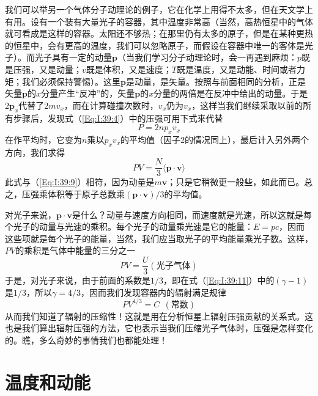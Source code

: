 我们可以举另一个气体分子动理论的例子，它在化学上用得不太多，但在天文学上有用。设有一个装有大量光子的容器，其中温度非常高（当然，高热恒星中的气体就可看成是这样的容器。太阳还不够热；在那里仍有太多的原子，但是在某种更热的恒星中，会有更高的温度，我们可以忽略原子，而假设在容器中唯一的客体是光子）。而光子具有一定的动量$\boldsymbol{p}$（当我们学习分子动理论时，会一再遇到麻烦：$p$既是压强，又是动量；$v$既是体积，又是速度；$T$既是温度，又是动能、时间或者力矩；我们必须保持警惕）。这里$\boldsymbol{p}$是动量，是矢量。按照与前面相同的分析，正是矢量$\boldsymbol{p}$的$x$分量产生“反冲”的，矢量$\boldsymbol{p}$的$x$分量的两倍是在反冲中给出的动量。于是$2\boldsymbol{p}_x$代替了$2mv_x$，而在计算碰撞次数时，$v_x$仍为$v_x$，这样当我们继续采取以前的所有步骤后，发现式（\ref{Eq:I:39:4}）中的压强可用下式来代替
\begin{equation}
    \label{Eq:I:39:15}
    P = 2np_xv_x
\end{equation}
在作平均时，它变为$n$乘以$p_xv_x$的平均值（因子$2$的情况同上），最后计入另外两个方向，我们求得
\begin{equation}
    \label{Eq:I:39:16}
    PV = \frac{N}{3}\langle \boldsymbol{p} \cdot \boldsymbol{v} \rangle
\end{equation}
此式与（\ref{Eq:I:39:9}）相符，因为动量是$m\boldsymbol{v}$；只是它稍微更一般些，如此而已。总之，压强乘体积等于原子总数乘$(\boldsymbol{p}\cdot\boldsymbol{v})/3$的平均值。

对光子来说，$\boldsymbol{p}\cdot\boldsymbol{v}$是什么？动量与速度方向相同，而速度就是光速，所以这就是每个光子的动量与光速的乘积。每个光子的动量乘光速是它的能量：$E=pc$，因而这些项就是每个光子的能量，当然，我们应当取光子的平均能量乘光子数。这样，$PV$的乘积是气体中能量的三分之一
\begin{equation}
    \label{Eq:I:39:17}
    PV = \frac{U}{3}(\text{光子气体})
\end{equation}
于是，对光子来说，由于前面的系数是$1/3$，即在式（\ref{Eq:I:39:11}）中的$(\gamma-1)$是$1/3$，所以$\gamma=4/3$，因而我们发现容器内的辐射满足规律
\begin{equation}
    \label{Eq:I:39:18}
    PV^{4/3} = C~~(\text{常数})
\end{equation}
从而我们知道了辐射的压缩性！这就是用在分析恒星上辐射压强贡献的关系式。这也是我们算出辐射压强的方法，它也表示当我们压缩光子气体时，压强是怎样变化的。瞧，多么奇妙的事情我们也都能处理！

\section{温度和动能}

